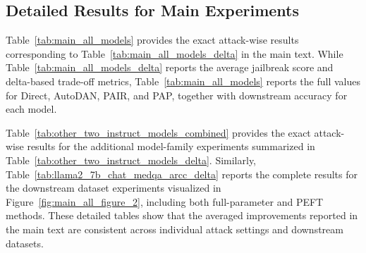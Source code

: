 \documentclass{article}
\begin{document}
\subsection{Detailed Results for Main Experiments}
\label{app:detailed_main_results}

Table~\ref{tab:main_all_models} provides the exact attack-wise results corresponding to Table~\ref{tab:main_all_models_delta} in the main text. While Table~\ref{tab:main_all_models_delta} reports the average jailbreak score and delta-based trade-off metrics, Table~\ref{tab:main_all_models} reports the full values for Direct, AutoDAN, PAIR, and PAP, together with downstream accuracy for each model.

Table~\ref{tab:other_two_instruct_models_combined} provides the exact attack-wise results for the additional model-family experiments summarized in Table~\ref{tab:other_two_instruct_models_delta}. Similarly, Table~\ref{tab:llama2_7b_chat_medqa_arcc_delta} reports the complete results for the downstream dataset experiments visualized in Figure~\ref{fig:main_all_figure_2}, including both full-parameter and PEFT methods. These detailed tables show that the averaged improvements reported in the main text are consistent across individual attack settings and downstream datasets.
\end{document}
